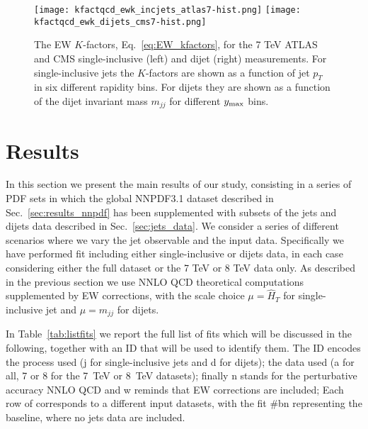 \begin{figure}[!t]
    \centering
    \texttt{[image: kfactqcd\_ewk\_incjets\_atlas7-hist.png]}
    \texttt{[image: kfactqcd\_ewk\_dijets\_cms7-hist.png]}\\
    \caption{The EW $K$-factors, Eq.~\eqref{eq:EW_kfactors}, for the 7 TeV ATLAS and CMS
       single-inclusive (left) and dijet (right)  measurements. For 
       single-inclusive jets the $K$-factors are shown as a function of jet $p_T$ 
       in six different rapidity bins. For dijets they are shown as a function of 
       the dijet invariant mass $m_{jj}$ for different $y_{\rm max}$ bins.}
    \label{fig:kfactewk_dijets7}
\end{figure}





\section{Results}
\label{sec:jets_res}
In this section we present the main results of our study, consisting in a series of PDF sets
in which the global NNPDF3.1 dataset described in Sec.~\ref{sec:results_nnpdf} has been supplemented with
subsets of the jets and dijets data described in Sec.~\ref{sec:jets_data}.
We consider a series of different scenarios where we vary the jet observable and the input data. 
Specifically we have performed fit including either single-inclusive or dijets data, in each case considering
either the full dataset or the 7 TeV or 8 TeV data only. 
As described in the previous section we use NNLO QCD theoretical computations supplemented by EW corrections, 
with the scale choice $\mu = \hat{H}_T$ for single-inclusive jet and $\mu = m_{jj}$ for dijets.

%
In Table~\ref{tab:listfits} we report the full list of fits which will be discussed in the following, together 
with an ID that will be used to identify them.
The ID encodes the process used (j for single-inclusive
jets and d for dijets); the data used (a for all, 7 or 8 for the
7~TeV or 8~TeV datasets); 
finally n stands for the perturbative accuracy NNLO QCD and w reminds that EW corrections are included;
Each row of corresponds to a different input datasets, with the fit \#bn representing the baseline, where no jets
data are included. 

